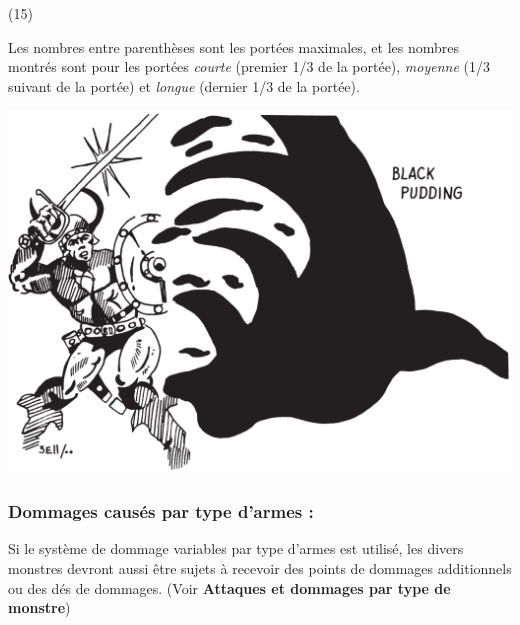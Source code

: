 {\parindent1cm (15)}

{\parindent2cm \parbox{14.5cm}{Les nombres entre parenthèses sont les portées maximales, et les nombres montrés sont pour les portées \textit{courte} (premier 1/3 de la portée), \textit{moyenne} (1/3 suivant de la portée) et \textit{longue} (dernier 1/3 de la portée).}}

\begin{center}
\includegraphics[width=0.8\linewidth]{./images/black-pudding2.png}
\end{center}

\subsubsection*{Dommages causés par type d'armes :}

Si le système de dommage variables par type d'armes est utilisé, les divers monstres devront aussi être sujets à recevoir des points de dommages additionnels ou des dés de dommages. (Voir \textbf{Attaques et dommages par type de monstre})

\bigskip

